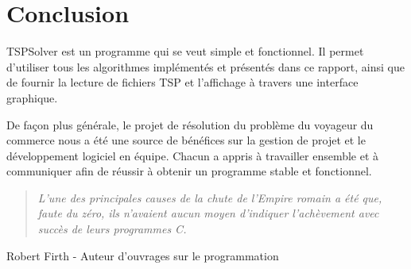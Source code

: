 \chapter*{Conclusion}

TSPSolver est un programme qui se veut simple et fonctionnel. Il permet d'utiliser tous les algorithmes implémentés et présentés dans ce rapport, ainsi que de fournir la lecture de fichiers TSP et l'affichage à travers une interface graphique.
\par\bigskip
De façon plus générale, le projet de résolution du problème du voyageur du commerce nous a été une source de bénéfices sur la gestion de projet et le développement logiciel en équipe. Chacun a appris à travailler ensemble et à communiquer afin de réussir à obtenir un programme stable et fonctionnel.
\par\bigskip
\begin{quotation}
\textit{L'une des principales causes de la chute de l'Empire romain a été que, faute du zéro, ils n'avaient aucun moyen d'indiquer l'achèvement avec succès de leurs programmes C.}
\end{quotation}
\begin{flushright}
Robert Firth - Auteur d'ouvrages sur le programmation
\end{flushright}